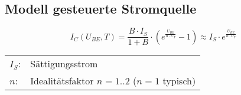 \subsection{Modell gesteuerte Stromquelle}
\[ I_C(U_{BE}, T) = \frac{B \cdot I_S}{1 + B} 
\cdot \left(e^{\frac{U_{BE}}{n \cdot U_T}} - 1\right) 
\approx I_S \cdot e^{\frac{U_{BE}}{n \cdot U_T}} \]
\begin{tabular}{@{}ll}
  $I_S$:	    & Sättigungsstrom \\
  $n$:	        & Idealitätsfaktor $n = 1..2$ ($n = 1$ typisch) \\
\end{tabular}

